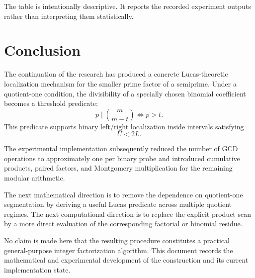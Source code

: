 \documentclass[11pt,a4paper]{article}
\begin{document}
The table is intentionally descriptive. It reports the recorded experiment outputs rather than interpreting them statistically.

\section{Conclusion}

The continuation of the research has produced a concrete Lucas-theoretic localization mechanism for the smaller prime factor of a semiprime. Under a quotient-one condition, the divisibility of a specially chosen binomial coefficient becomes a threshold predicate:
\[
\boxed{
 p\mid\binom{m}{m-t}
 \iff p>t
}.
\]
This predicate supports binary left/right localization inside intervals satisfying
\[
U<2L.
\]

The experimental implementation subsequently reduced the number of GCD operations to approximately one per binary probe and introduced cumulative products, paired factors, and Montgomery multiplication for the remaining modular arithmetic.

The next mathematical direction is to remove the dependence on quotient-one segmentation by deriving a useful Lucas predicate across multiple quotient regimes. The next computational direction is to replace the explicit product scan by a more direct evaluation of the corresponding factorial or binomial residue.

No claim is made here that the resulting procedure constitutes a practical general-purpose integer factorization algorithm. This document records the mathematical and experimental development of the construction and its current implementation state.
\end{document}
